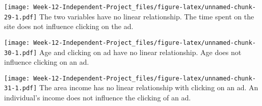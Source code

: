 \documentclass[
]{article}
\newenvironment{Shaded}{\begin{snugshade}}{\end{snugshade}}
\newcommand{\AttributeTok}[1]{\textcolor[rgb]{0.77,0.63,0.00}{#1}}
\newcommand{\CommentTok}[1]{\textcolor[rgb]{0.56,0.35,0.01}{\textit{#1}}}
\newcommand{\DecValTok}[1]{\textcolor[rgb]{0.00,0.00,0.81}{#1}}
\newcommand{\DocumentationTok}[1]{\textcolor[rgb]{0.56,0.35,0.01}{\textbf{\textit{#1}}}}
\newcommand{\FunctionTok}[1]{\textcolor[rgb]{0.00,0.00,0.00}{#1}}
\newcommand{\NormalTok}[1]{#1}
\newcommand{\SpecialCharTok}[1]{\textcolor[rgb]{0.00,0.00,0.00}{#1}}
\newcommand{\StringTok}[1]{\textcolor[rgb]{0.31,0.60,0.02}{#1}}
\begin{document}
\texttt{[image: Week-12-Independent-Project\_files/figure-latex/unnamed-chunk-29-1.pdf]}
The two variables have no linear relationship. The time spent on the
site does not influence clicking on the ad.

\begin{Shaded}
\end{Shaded}

\texttt{[image: Week-12-Independent-Project\_files/figure-latex/unnamed-chunk-30-1.pdf]}
Age and clicking on ad have no linear relationship. Age does not
influence clicking on an ad.

\begin{Shaded}
\end{Shaded}

\texttt{[image: Week-12-Independent-Project\_files/figure-latex/unnamed-chunk-31-1.pdf]}
The area income has no linear relationship with clicking on an ad. An
individual's income does not influence the clicking of an ad.
\end{document}
